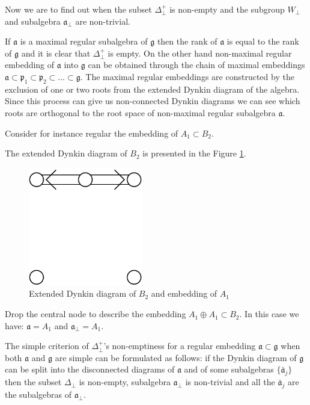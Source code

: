 \documentclass[a4paper,12pt]{article}
\theoremstyle{definition} \newtheorem{Def}{Definition}
\begin{document}
Now we are to find out when the subset $\Delta^{+}_{\bot}$ is non-empty
and the subgroup $W_{\bot}$ and subalgebra $\mathfrak{a}_{\bot}$ are non-trivial.

If $\mathfrak{a}$ is a maximal regular subalgebra of $\mathfrak{g}$ then
the rank of $\mathfrak{a}$ is equal to the rank of $\mathfrak{g}$ and
it is clear that $\Delta^{+}_{\bot}$ is empty.
On the other hand
non-maximal regular embedding of $\mathfrak{a}$ into $\mathfrak{g}$ can be obtained
through the chain of maximal embeddings
$\mathfrak{a}\subset \mathfrak{p}_1\subset \mathfrak{p}_2\subset\dots \subset \mathfrak{g}$.
The maximal regular embeddings are constructed by the exclusion of one or two roots
from the extended Dynkin diagram of the algebra. Since this process can give us
non-connected Dynkin diagrams we can see which roots are orthogonal to the root
space of non-maximal regular subalgebra $\mathfrak{a}$.

Consider for instance regular the embedding of $A_1\subset B_2$.

The extended Dynkin diagram of $B_2$ is presented in the Figure \ref{fig:B2Dynkin}.
\begin{figure}[ph]
  \centering
  \includegraphics[width=50mm]{B2_A1_diagram.pdf}
  \caption{Extended Dynkin diagram of $B_2$ and embedding of $A_1$}
  \label{fig:B2Dynkin}
\end{figure}
Drop the central node to describe the embedding $A_1\oplus A_1\subset B_2$.
In this case we have: $\mathfrak{a}=A_1$ and $\mathfrak{a}_{\bot}=A_1$.

The simple criterion of $\Delta^{+}_{\bot}$'s non-emptiness for a regular
embedding $\mathfrak{a}\subset \mathfrak{g}$
when both $\mathfrak{a}$ and $\mathfrak{g}$ are simple can be formulated
as follows:
if the Dynkin diagram of $\mathfrak{g}$ can be split into the disconnected
diagrams of $\mathfrak{a}$ and of some subalgebras $\{\mathfrak{\bar{a}}_j\}$
then the subset $\Delta_{\bot}$ is non-empty,
subalgebra $\mathfrak{a}_{\bot}$ is non-trivial and all the
$\mathfrak{\bar{a}}_j$ are the subalgebras of $\mathfrak{a}_{\bot}$.
\end{document}
